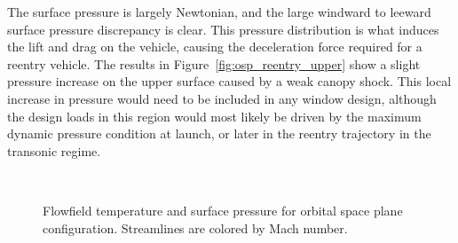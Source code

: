 The surface pressure is largely Newtonian, and the large windward to leeward surface pressure discrepancy is clear.  This pressure distribution is what induces the lift and drag on the vehicle, causing the deceleration force required for a reentry vehicle.  The results in Figure~\ref{fig:osp_reentry_upper} show a slight pressure increase on the upper surface caused by a weak canopy shock. This local increase in pressure would need to be included in any window design, although the design loads in this region would most likely be driven by the maximum dynamic pressure condition at launch, or later in the reentry trajectory in the transonic regime. 
\begin{figure}[hbtp]
  \begin{center}
     \\
    \caption[Flowfield temperature and surface pressure for orbital space plane configuration.]{Flowfield temperature and surface pressure for orbital space plane configuration. Streamlines are colored by Mach number.}
    \label{fig:osp_reentry}
  \end{center}
\end{figure}

